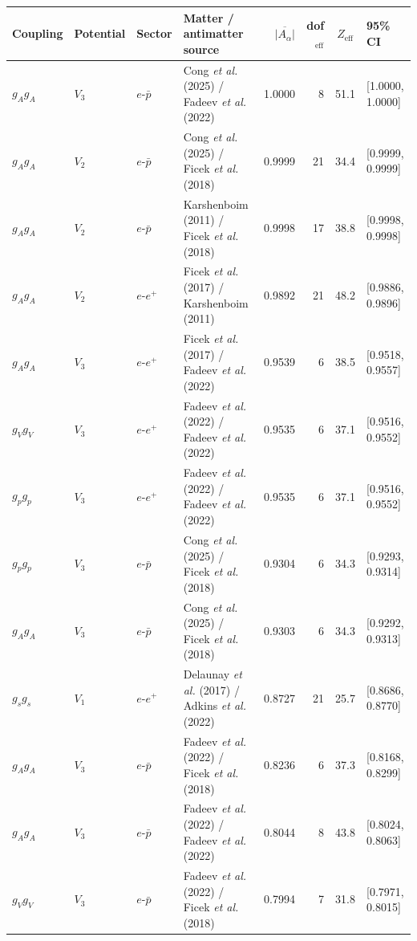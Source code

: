 \begin{table}[p]
\centering
\footnotesize
\begin{tabular}{@{}l l l >{\raggedright\arraybackslash}p{3.4cm} r r c l@{}}
\toprule
Coupling & Potential & Sector & Matter / antimatter source & $\overline{|A_\alpha|}$ & dof$_{\text{eff}}$ & $Z_{\text{eff}}$ & 95\% CI \\
\midrule
$g_Ag_A$    & $V_3$    & $e$-$\bar p$ & Cong \textit{et al.} (2025) / Fadeev \textit{et al.} (2022) & 1.0000 & 8  & 51.1 & [1.0000, 1.0000] \\
$g_Ag_A$    & $V_2$    & $e$-$\bar p$ & Cong \textit{et al.} (2025) / Ficek \textit{et al.} (2018) & 0.9999 & 21  & 34.4 & [0.9999, 0.9999] \\
$g_Ag_A$    & $V_2$    & $e$-$\bar p$ & Karshenboim (2011) / Ficek \textit{et al.} (2018) & 0.9998 & 17  & 38.8 & [0.9998, 0.9998] \\
$g_Ag_A$    & $V_2$    & $e$-$e^+$    & Ficek \textit{et al.} (2017) / Karshenboim (2011) & 0.9892 & 21  & 48.2 & [0.9886, 0.9896] \\
$g_Ag_A$    & $V_3$    & $e$-$e^+$    & Ficek \textit{et al.} (2017) / Fadeev \textit{et al.} (2022) & 0.9539 & 6  & 38.5 & [0.9518, 0.9557] \\
$g_Vg_V$    & $V_3$    & $e$-$e^+$    & Fadeev \textit{et al.} (2022) / Fadeev \textit{et al.} (2022) & 0.9535 & 6  & 37.1 & [0.9516, 0.9552] \\
$g_pg_p$    & $V_3$    & $e$-$e^+$    & Fadeev \textit{et al.} (2022) / Fadeev \textit{et al.} (2022) & 0.9535 & 6  & 37.1 & [0.9516, 0.9552] \\
$g_pg_p$    & $V_3$    & $e$-$\bar p$ & Cong \textit{et al.} (2025) / Ficek \textit{et al.} (2018) & 0.9304 & 6  & 34.3 & [0.9293, 0.9314] \\
$g_Ag_A$    & $V_3$    & $e$-$\bar p$ & Cong \textit{et al.} (2025) / Ficek \textit{et al.} (2018) & 0.9303 & 6  & 34.3 & [0.9292, 0.9313] \\
$g_sg_s$    & $V_1$    & $e$-$e^+$    & Delaunay \textit{et al.} (2017) / Adkins \textit{et al.} (2022) & 0.8727 & 21  & 25.7 & [0.8686, 0.8770] \\
$g_Ag_A$    & $V_3$    & $e$-$\bar p$ & Fadeev \textit{et al.} (2022) / Ficek \textit{et al.} (2018) & 0.8236 & 6  & 37.3 & [0.8168, 0.8299] \\
$g_Ag_A$    & $V_3$    & $e$-$\bar p$ & Fadeev \textit{et al.} (2022) / Fadeev \textit{et al.} (2022) & 0.8044 & 8  & 43.8 & [0.8024, 0.8063] \\
$g_Vg_V$    & $V_3$    & $e$-$\bar p$ & Fadeev \textit{et al.} (2022) / Ficek \textit{et al.} (2018) & 0.7994 & 7  & 31.8 & [0.7971, 0.8015] \\

\end{tabular}
\end{table}
